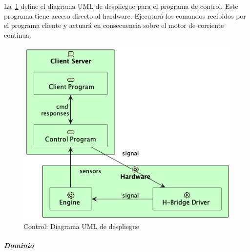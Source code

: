 
La~\cref{fig:Control-Diagrama UML de despliegue} define el diagrama UML de despliegue para el programa de control.
Este programa tiene acceso directo al hardware.
Ejecutará los comandos recibidos por el programa cliente y actuará en consecuencia sobre el motor de corriente continua.

\begin{figure}[H]
    \centering
    \includegraphics[height=0.35\textheight]{./part/Proyecto_ejecutivo/memoria_descriptiva/descripcionDelProyecto/control/uml/controlConcept}
    \caption{Control: Diagrama UML de despliegue}\label{fig:Control-Diagrama UML de despliegue}
\end{figure}

\subparagraph{Dominio}

